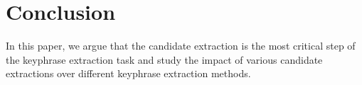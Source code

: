 
\section{Conclusion}
\label{sec:conclusion}
  In this paper, we argue that the candidate extraction is the most critical
  step of the keyphrase extraction task and study the impact of various
  candidate extractions over different keyphrase extraction methods.

